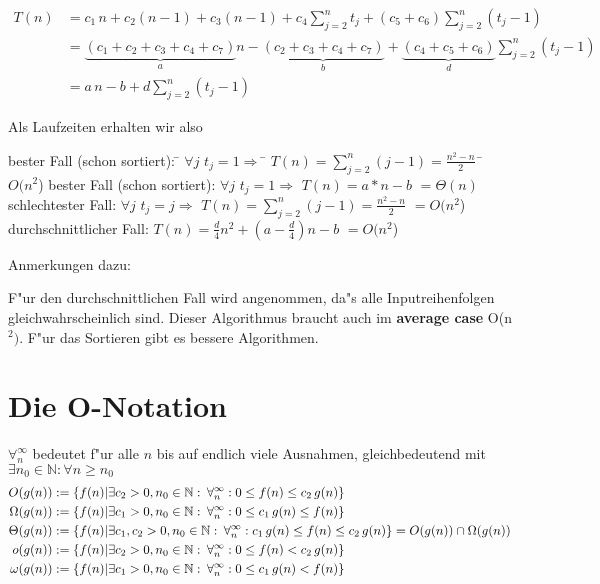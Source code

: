 \documentclass[draft,12pt]{scrreprt}
\theoremstyle{break}
\begin{document}
\begin{align*}
  T(n) &= c_1\,n + c_2(n-1) + c_3(n-1) + c_4\sum_{j=2}^{n}t_j
     + (c_5+c_6)\sum_{j=2}^{n}(t_j-1)\\
  &=\underbrace{(c_1+c_2+c_3+c_4+c_7)}_{a}n -
     \underbrace{(c_2+c_3+c_4+c_7)}_{b} +
     \underbrace{(c_4+c_5+c_6)}_{d}\sum_{j=2}^{n}(t_j-1)\\
  &=  a\,n-b+d\sum_{j=2}^{n}(t_j-1)
\end{align*}

Als Laufzeiten erhalten wir also
\begin{tabbing}
bester Fall (schon sortiert): \= $ \forall j \, \, t_j=1 \Rightarrow$ \= $T(n)=\sum_{j=2}^{n}(j-1)= \frac {n^2-n}{2} \,$ \= $O(n^2$) \kill
bester Fall (schon sortiert): \> $ \forall j \, \, t_j=1 \Rightarrow$ \> $T(n)=a*n-b$ \> $=\Theta(n)$ \\ 
schlechtester Fall: \> $ \forall j \, \, t_j=j \Rightarrow$ \> $T(n)=\sum_{j=2}^{n}(j-1)= \frac {n^2-n}{2}$ \> $=O(n^2$)\\
durchschnittlicher Fall: \> \> $T(n)=\frac{d}{4}n^2+(a-\frac{d}{4})n-b$ \> $=O(n^2$)
\end{tabbing}

\noindent Anmerkungen dazu:

F"ur den durchschnittlichen Fall wird angenommen, da"s alle
Inputreihenfolgen gleichwahrscheinlich sind.
Dieser Algorithmus braucht auch im \textbf{average case} O(n$^2)$. F"ur das Sortieren gibt es
bessere Algorithmen.

\section{Die O-Notation}
$\forall_n^\infty$ bedeutet f"ur alle $n$ bis auf endlich viele
Ausnahmen, gleichbedeutend mit $\exists n_0 \in \mathbb{N}: \forall n\geq n_0$
\begin{align*}
  O(g(n)) &:= \{ f(n) | \exists c_2 > 0, n_0 \in \mathbb{N}:\:
    \forall_n^\infty: 0\leq f(n)\leq c_2\,g(n)\}\\
  \Omega(g(n)) &:= \{ f(n) | \exists{}c_1 > 0, n_0 \in  \mathbb{N}:\:
    \forall_n^\infty: 0\leq c_1\,g(n)\leq f(n) 
    \} \\
  \Theta(g(n)) &:= \{ f(n) | \exists c_1, c_2 > 0, n_0 \in \mathbb{N}:\: 
    \forall_n^\infty: c_1\,g(n)\leq f(n)\leq c_2\,g(n)\} =
    \hfill O(g(n)) \cap \Omega(g(n))\\
o(g(n)) &:= \{ f(n) | \exists c_2 > 0, n_0 \in \mathbb{N}:\:
    \forall_n^\infty: 0\leq f(n)< c_2\,g(n)\}\\
\omega(g(n)) &:= \{ f(n) | \exists{}c_1 > 0, n_0 \in  \mathbb{N}:\:
    \forall_n^\infty: 0\leq c_1\,g(n)< f(n) 
    \}
\end{align*} 
\end{document}
